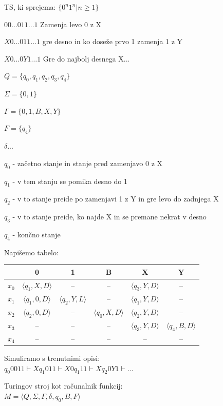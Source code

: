 \documentclass[10pt,a4paper,oneside]{book}
\begin{document}
\begin{primeri}
\item {TS, ki sprejema: $\{0^n 1^n | n \geq 1\}$
	\begin{items}
	\item $00\dots011\dots1$
	    Zamenja levo 0 z X

    \item $X0\dots011\dots1$%
    gre desno in ko doseže prvo 1 zamenja 1 z Y
    \item $X0\dots0Y1\dots1$
    Gre do najbolj desnega X...
	\end{items}
	\begin{items}
    \item $Q=\{q_0, q_1,q_2,q_3,q_4\}$
    \item $\Sigma = \{ 0,1 \}$
    \item $\Gamma = \{ 0,1,B,X,Y \}$
    \item $F = \{ q_4 \}$
    \item $\delta$...
	\end{items}
    
    \begin{items}
    \item $q_0$ - začetno stanje in stanje pred zamenjavo 0 z X
    \item $q_1$ - v tem stanju se pomika desno do 1
    \item $q_2$ - v to stanje preide po zamenjavi 1 z Y in gre levo do zadnjega X
    \item $q_3$ - v to stanje preide, ko najde X in se premane nekrat v desno
    \item $q_4$ - končno stanje
    \end{items}

    Napišemo tabelo:\\
    \begin{tabular}{ c | c c c c c}%
      \ & 0 & 1 & B & X & Y\\ \hline
      $x_0$& $\langle q_1,X,D\rangle$ & -- & -- & $\langle q_3,Y,D\rangle$ & --\\
      $x_1$& $\langle q_1,0,D\rangle$ & $\langle q_2,Y,L\rangle$ & -- & $\langle q_1,Y,D\rangle$ & --\\
      $x_2$& $\langle q_2,0,D\rangle$ & -- & $\langle q_0,X,D\rangle$ & $\langle q_2,Y,D\rangle$ & --\\
      $x_3$& -- & -- & -- & $\langle q_3,Y,D\rangle$ & $\langle q_4,B,D\rangle$\\
      $x_4$& -- & -- & -- & -- & --\\
    \end{tabular}
	\br
	Simuliramo s trenutnimi opisi:\\
	$q_0 0011 \vdash X q_1 011 \vdash X 0 q_1 11 \vdash X q_2 0 Y 1 \vdash \dots$
}
\item {Turingov stroj kot računalnik funkcij:\\
    $M=\langle Q, \Sigma, \Gamma, \delta, q_0, B, F \rangle$
    
}
\end{primeri}
\end{document}

